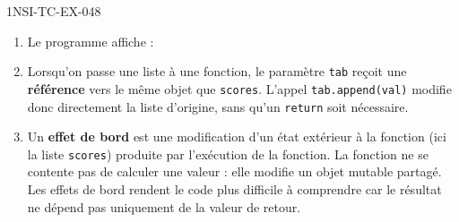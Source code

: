 \begin{corrige}{1NSI-TC-EX-048}
\begin{enumerate}
  \item Le programme affiche :
\begin{console}
[10, 20, 30]
\end{console}

  \item Lorsqu'on passe une liste à une fonction, le paramètre \lstinline{tab} reçoit une \textbf{référence} vers le même objet que \lstinline{scores}. L'appel \lstinline{tab.append(val)} modifie donc directement la liste d'origine, sans qu'un \lstinline{return} soit nécessaire.

  \item Un \textbf{effet de bord} est une modification d'un état extérieur à la fonction (ici la liste \lstinline{scores}) produite par l'exécution de la fonction. La fonction ne se contente pas de calculer une valeur : elle modifie un objet mutable partagé. Les effets de bord rendent le code plus difficile à comprendre car le résultat ne dépend pas uniquement de la valeur de retour.
\end{enumerate}
\end{corrige}
